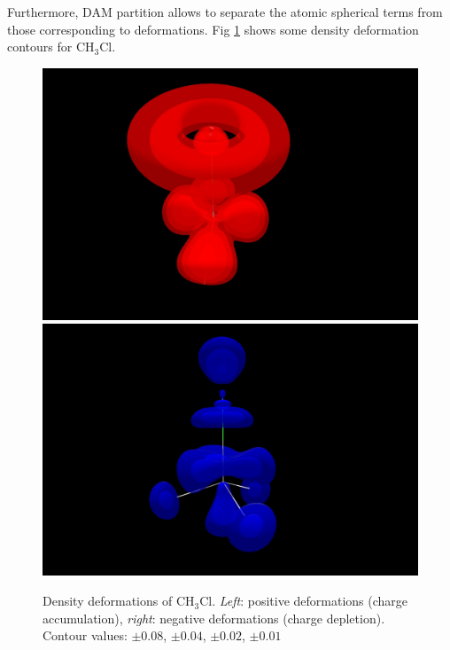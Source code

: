 \documentclass[10pt]{article}
\begin{document}
Furthermore, DAM partition allows to separate the atomic spherical terms
from 
those corresponding to deformations. Fig \ref{fig:6_1_2} shows some
density deformation contours for CH$_3$Cl. 

\begin{figure}[H]
\vspace*{-2mm}
\begin{center}
\includegraphics[width=.33\linewidth]{CH3Cl-QVTZ-d-defpos.png}
\hspace*{5mm}
\includegraphics[width=.33\linewidth]{CH3Cl-QVTZ-d-defneg.png}
\vspace*{0.cm}
\end{center}
\caption[Density deformations of CH$_3$Cl]{ Density deformations of CH$_3$Cl. {\it Left}: positive deformations
(charge accumulation),
{\it right}: negative deformations (charge depletion). Contour values:
$\pm 0.08$, $\pm 0.04$, $\pm 0.02$, $\pm 0.01$
\label{fig:6_1_2}}
\end{figure}
\end{document}
